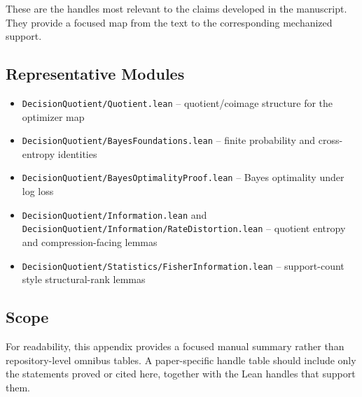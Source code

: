 These are the handles most relevant to the claims developed in the manuscript. They provide a focused map from the text to the corresponding mechanized support.

\subsection{Representative Modules}

\begin{itemize}
\item \texttt{DecisionQuotient/Quotient.lean} -- quotient/coimage structure for the optimizer map
\item \texttt{DecisionQuotient/BayesFoundations.lean} -- finite probability and cross-entropy identities
\item \texttt{DecisionQuotient/BayesOptimalityProof.lean} -- Bayes optimality under log loss
\item \texttt{DecisionQuotient/Information.lean} and \texttt{DecisionQuotient/Information/RateDistortion.lean} -- quotient entropy and compression-facing lemmas
\item \texttt{DecisionQuotient/Statistics/FisherInformation.lean} -- support-count style structural-rank lemmas
\end{itemize}

\subsection{Scope}

For readability, this appendix provides a focused manual summary rather than repository-level omnibus tables. A paper-specific handle table should include only the statements proved or cited here, together with the Lean handles that support them.

